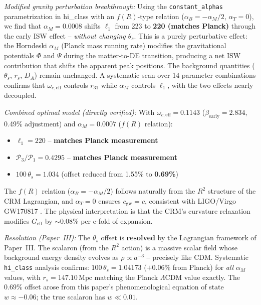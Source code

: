 \documentclass[aps,prd,twocolumn,superscriptaddress,nofootinbib]{revtex4-2}
\begin{document}
\textit{Modified gravity perturbation breakthrough:} Using the \texttt{constant\_alphas} parametrization in hi\_class \cite{Zumalacarregui2017} with an $f(R)$-type relation ($\alpha_B = -\alpha_M/2$, $\alpha_T = 0$), we find that $\alpha_M = 0.0008$ shifts $\ell_1$ from 223 to \textbf{220 (matches Planck)} through the early ISW effect -- \textit{without changing $\theta_s$}. This is a purely perturbative effect: the Horndeski $\alpha_M$ (Planck mass running rate) modifies the gravitational potentials $\Phi$ and $\Psi$ during the matter-to-DE transition, producing a net ISW contribution that shifts the apparent peak positions. The background quantities ($\theta_s$, $r_s$, $D_A$) remain unchanged. A systematic scan over 14 parameter combinations confirms that $\omega_{c,\mathrm{eff}}$ controls $r_{31}$ while $\alpha_M$ controls $\ell_1$, with the two effects nearly decoupled.

\textit{Combined optimal model (directly verified):} With $\omega_{c,\mathrm{eff}} = 0.1143$ ($\beta_{\mathrm{early}} = 2.834$, 0.49\% adjustment) and $\alpha_M = 0.0007$ ($f(R)$ relation):
\begin{itemize}
\item $\ell_1 = 220$ -- \textbf{matches Planck measurement}
\item $\mathcal{P}_3/\mathcal{P}_1 = 0.4295$ -- \textbf{matches Planck measurement}
\item $100\,\theta_s = 1.034$ (offset reduced from 1.55\% to \textbf{0.69\%})
\end{itemize}
The $f(R)$ relation ($\alpha_B = -\alpha_M/2$) follows naturally from the $R^2$ structure of the CRM Lagrangian, and $\alpha_T = 0$ ensures $c_{\mathrm{gw}} = c$, consistent with LIGO/Virgo GW170817 \cite{Abbott2017gw}. The physical interpretation is that the CRM's curvature relaxation modifies $G_{\mathrm{eff}}$ by $\sim$0.08\% per e-fold of expansion.

\textit{Resolution (Paper~III):} The $\theta_s$ offset is \textbf{resolved} by the Lagrangian framework of Paper~III. The scalaron (from the $R^2$ action) is a massive scalar field whose background energy density evolves as $\rho \propto a^{-3}$ -- precisely like CDM. Systematic \texttt{hi\_class} analysis confirms: $100\,\theta_s = 1.04173$ ($+0.06\%$ from Planck) for \textit{all} $\alpha_M$ values, with $r_s = 147.10\,\text{Mpc}$ matching the Planck $\Lambda$CDM value exactly. The $0.69\%$ offset arose from this paper's phenomenological equation of state $w \approx -0.06$; the true scalaron has $w \ll 0.01$.
\end{document}
